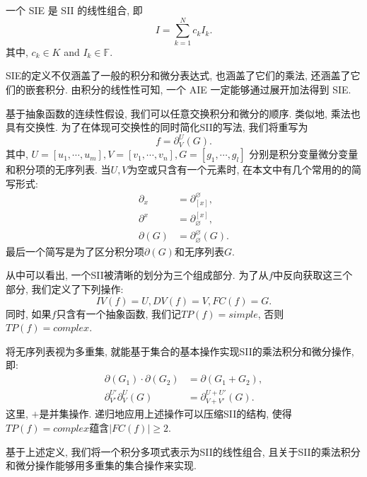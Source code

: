 \begin{definition}
一个 SIE 是 SII 的线性组合, 即
\begin{equation}
I = \sum_{k=1}^N{c_k I_k}.
\label{std_form}
\end{equation} 
其中, $c_k \in K$ and $I_k \in \mathbb F$. 
\end{definition}

SIE的定义不仅涵盖了一般的积分和微分表达式, 也涵盖了它们的乘法, 还涵盖了它们的嵌套积分. 由积分的线性性可知, 一个 AIE 一定能够通过展开加法得到 SIE.

基于抽象函数的连续性假设, 我们可以任意交换积分和微分的顺序. 类似地, 乘法也具有交换性. 为了在体现可交换性的同时简化SII的写法, 我们将重写为
\begin{equation} 
f=\partial^U_V(G). \label{st_form}
\end{equation} 
其中,  $U=[u_1,\cdots,u_m], V=[v_1,\cdots,v_n], G=[g_1,\cdots,g_l]$ 分别是积分变量\D 微分变量和积分项的无序列表. 当$U,V$为空或只含有一个元素时, 在本文中有几个常用的的简写形式:
\begin{equation}
\begin{split}
\partial_x&=\partial^\varnothing_{[x]},  \\
\partial^x&=\partial_\varnothing^{[x]},  \\ 
\partial(G)&=\partial^\varnothing_\varnothing(G).
\end{split}
\end{equation}
最后一个简写是为了区分积分项$\partial(G)$和无序列表$G$. 

从中可以看出, 一个SII被清晰的划分为三个组成部分. 为了从$f$中反向获取这三个部分, 我们定义了下列操作:
\begin{equation}
IV(f)=U,DV(f)=V,FC(f)=G.
\end{equation}
同时, 如果$f$只含有一个抽象函数, 我们记$TP(f)=simple$, 否则$TP(f)=complex$. 

将无序列表视为多重集, 就能基于集合的基本操作实现SII的乘法\D 积分和微分操作, 即:
\begin{equation}
\begin{split}
\partial(G_1)\cdot\partial(G_2)&=\partial(G_1+G_2),\\
\partial^{U'}_{V'}\partial^{U}_{V}(G)&=\partial^{U+U'}_{V+V'}(G).
\end{split}
\label{ops}
\end{equation}
这里, $+$是并集操作. 递归地应用上述操作可以压缩SII的结构, 使得$TP(f)=complex$蕴含$|FC(f)|\ge 2$. 

基于上述定义, 我们将一个积分多项式表示为SII的线性组合, 且关于SII的乘法\D 积分和微分操作能够用多重集的集合操作来实现. 


